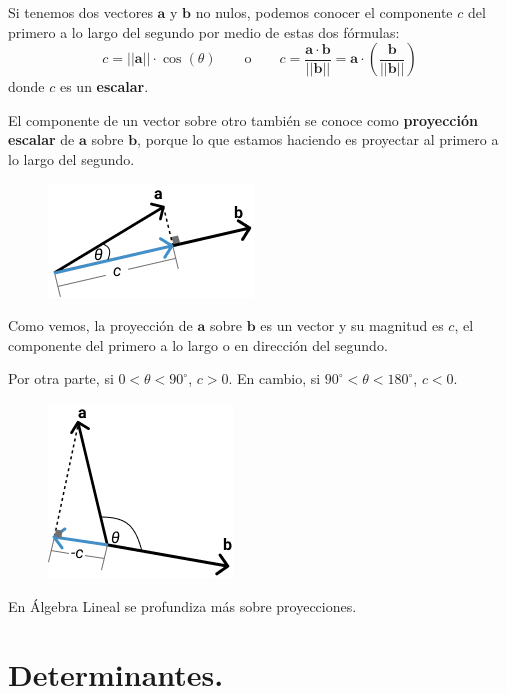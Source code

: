 \documentclass[12pt]{article}
\begin{document}
Si tenemos dos vectores $\mathbf{a}$ y $\mathbf{b}$ no nulos, podemos conocer el componente $c$ del primero a lo largo del segundo por medio de estas dos fórmulas:
\[
  c = ||\mathbf{a}|| \cdot \cos(\theta) \qquad \text{o} \qquad
  c = \frac{\mathbf{a} \cdot \mathbf{b}}{||\mathbf{b}||} = \mathbf{a} \cdot \left(\frac{\mathbf{b}}{||\mathbf{b}||}\right)
\]
donde $c$ es un \textbf{escalar}.

El componente de un vector sobre otro también se conoce como \textbf{proyección escalar} de $\mathbf{a}$ sobre $\mathbf{b}$, porque lo que estamos haciendo es proyectar al primero a lo largo del segundo.

\begin{figure}[hbt!]
\centering
\includegraphics[scale=0.7]{img/scalar-proj-1.jpg}
\end{figure}

Como vemos, la proyección de $\mathbf{a}$ sobre $\mathbf{b}$ es un vector y su magnitud es $c$, el componente del primero a lo largo o en dirección del segundo.

Por otra parte, si $0 < \theta < 90^{\circ}$, $c > 0$. En cambio, si $90^{\circ} < \theta < 180^{\circ}$, $c < 0$.

\begin{figure}[hbt!]
\centering
\includegraphics[scale=0.6]{img/scalar-proj-2.jpg}
\end{figure}

En Álgebra Lineal se profundiza más sobre proyecciones.



\section{Determinantes.}
\end{document}
